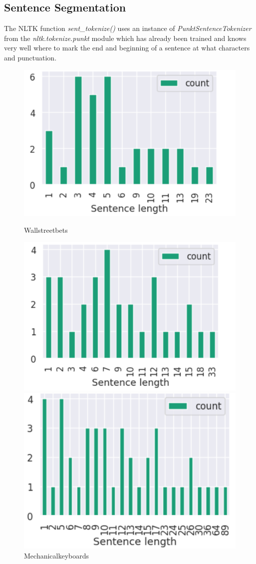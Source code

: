 \documentclass[sigconf,nonacm=true]{acmart}
\begin{document}
\subsection{Sentence Segmentation}
The NLTK function \textit{sent\_tokenize()} uses an instance of \textit{PunktSentenceTokenizer} from the \textit{nltk.tokenize.punkt} module which has already been trained and knows very well where to mark the end and beginning of a sentence at what characters and punctuation. \smallskip

\begin{figure}[H]
	\centering
	\includegraphics[scale = 0.35]{sentence1.png}
	\caption{Wallstreetbets}
	\includegraphics[scale=0.35]{sentence2.png}
	\caption{Mechanicalkeyboards}
	\includegraphics[scale=0.35]{sentence3.png}

\end{figure}
\end{document}

